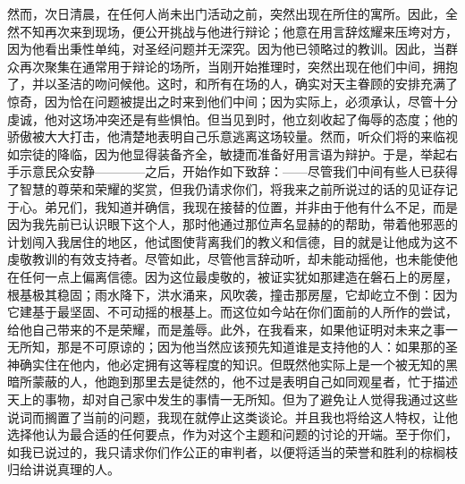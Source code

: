 然而，次日清晨，在任何人尚未出门活动之前，突然出现在所住的寓所。因此，全然不知再次来到现场，便公开挑战与他进行辩论；他意在用言辞炫耀来压垮对方，因为他看出秉性单纯，对圣经问题并无深究。因为他已领略过的教训。因此，当群众再次聚集在通常用于辩论的场所，当刚开始推理时，突然出现在他们中间，拥抱了，并以圣洁的吻问候他。这时，和所有在场的人，确实对天主眷顾的安排充满了惊奇，因为恰在问题被提出之时来到他们中间；因为实际上，必须承认，尽管十分虔诚，他对这场冲突还是有些惧怕。但当见到时，他立刻收起了侮辱的态度；他的骄傲被大大打击，他清楚地表明自己乐意逃离这场较量。然而，听众们将的来临视如宗徒的降临，因为他显得装备齐全，敏捷而准备好用言语为辩护。于是，举起右手示意民众安静————之后，开始作如下致辞：——尽管我们中间有些人已获得了智慧的尊荣和荣耀的奖赏，但我仍请求你们，将我来之前所说过的话的见证存记于心。弟兄们，我知道并确信，我现在接替的位置，并非由于他有什么不足，而是因为我先前已认识眼下这个人，那时他通过那位声名显赫的的帮助，带着他邪恶的计划闯入我居住的地区，他试图使背离我们的教义和信德，目的就是让他成为这不虔敬教训的有效支持者。尽管如此，尽管他言辞动听，却未能动摇他，也未能使他在任何一点上偏离信德。因为这位最虔敬的，被证实犹如那建造在磐石上的房屋，根基极其稳固；雨水降下，洪水涌来，风吹袭，撞击那房屋，它却屹立不倒：因为它建基于最坚固、不可动摇的根基上。而这位如今站在你们面前的人所作的尝试，给他自己带来的不是荣耀，而是羞辱。此外，在我看来，如果他证明对未来之事一无所知，那是不可原谅的；因为他当然应该预先知道谁是支持他的人：如果那的圣神确实住在他内，他必定拥有这等程度的知识。但既然他实际上是一个被无知的黑暗所蒙蔽的人，他跑到那里去是徒然的，他不过是表明自己如同观星者，忙于描述天上的事物，却对自己家中发生的事情一无所知。但为了避免让人觉得我通过这些说词而搁置了当前的问题，我现在就停止这类谈论。并且我也将给这人特权，让他选择他认为最合适的任何要点，作为对这个主题和问题的讨论的开端。至于你们，如我已说过的，我只请求你们作公正的审判者，以便将适当的荣誉和胜利的棕榈枝归给讲说真理的人。\par

